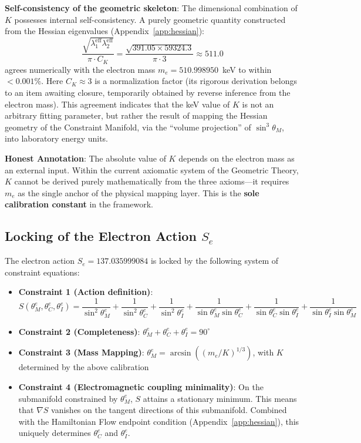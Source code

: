 \documentclass[aps,prd,reprint,nofootinbib]{revtex4-2}
\begin{document}
\textbf{Self-consistency of the geometric skeleton}: The dimensional combination of $K$ possesses internal self-consistency. A purely geometric quantity constructed from the Hessian eigenvalues (Appendix~\ref{app:hessian}):
\begin{equation}
\frac{\sqrt{\lambda_1^{\text{eff}} \lambda_2^{\text{eff}}}}{\pi \cdot C_K} = \frac{\sqrt{391.05 \times 59324.3}}{\pi \cdot 3} \approx 511.0
\end{equation}
agrees numerically with the electron mass $m_e = 510.998950$~keV to within $< 0.001\%$. Here $C_K \approx 3$ is a normalization factor (its rigorous derivation belongs to an item awaiting closure, temporarily obtained by reverse inference from the electron mass). This agreement indicates that the keV value of $K$ is not an arbitrary fitting parameter, but rather the result of mapping the Hessian geometry of the Constraint Manifold, via the ``volume projection'' of $\sin^3\theta_M$, into laboratory energy units.

\textbf{Honest Annotation}: The absolute value of $K$ depends on the electron mass as an external input. Within the current axiomatic system of the Geometric Theory, $K$ cannot be derived purely mathematically from the three axioms---it requires $m_e$ as the single anchor of the physical mapping layer. This is the \textbf{sole calibration constant} in the framework.

\subsection{Locking of the Electron Action $S_e$}

The electron action $S_e = 137.035999084$ is locked by the following system of constraint equations:

\begin{itemize}
\item \textbf{Constraint 1 (Action definition)}:
  \begin{equation}
  S(\theta_M^e, \theta_C^e, \theta_I^e) = \frac{1}{\sin^2\theta_M^e} + \frac{1}{\sin^2\theta_C^e} + \frac{1}{\sin^2\theta_I^e} + \frac{1}{\sin\theta_M^e\sin\theta_C^e} + \frac{1}{\sin\theta_C^e\sin\theta_I^e} + \frac{1}{\sin\theta_I^e\sin\theta_M^e}
  \end{equation}

\item \textbf{Constraint 2 (Completeness)}: $\theta_M^e + \theta_C^e + \theta_I^e = 90^\circ$

\item \textbf{Constraint 3 (Mass Mapping)}: $\theta_M^e = \arcsin((m_e/K)^{1/3})$, with $K$ determined by the above calibration

\item \textbf{Constraint 4 (Electromagnetic coupling minimality)}: On the submanifold constrained by $\theta_M^e$, $S$ attains a stationary minimum. This means that $\nabla S$ vanishes on the tangent directions of this submanifold. Combined with the Hamiltonian Flow endpoint condition (Appendix~\ref{app:hessian}), this uniquely determines $\theta_C^e$ and $\theta_I^e$.
\end{itemize}
\end{document}
